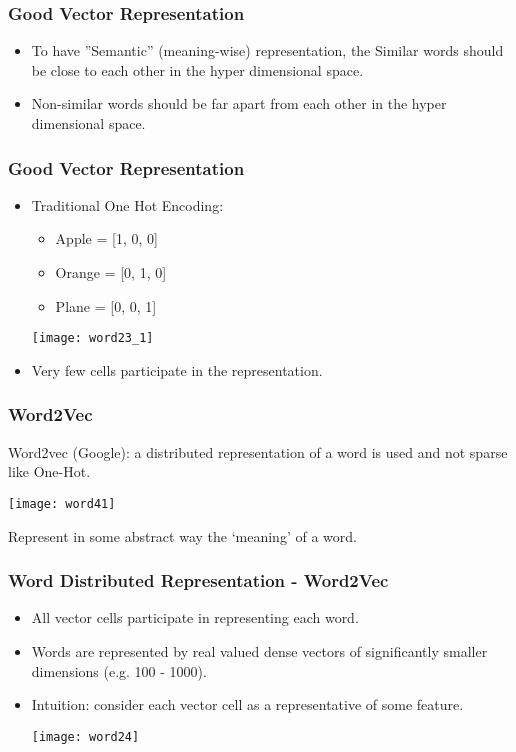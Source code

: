 \begin{frame}[fragile]\frametitle{Good Vector Representation}
\begin{itemize}
\item To have ''Semantic'' (meaning-wise) representation, the Similar words should be close to each other in the hyper dimensional space.
\item Non-similar words should be far apart from each other in the hyper dimensional space.
\end{itemize}
\end{frame}

\begin{frame}[fragile]\frametitle{Good Vector Representation}
\begin{itemize}
\item Traditional One Hot Encoding:
	\begin{itemize}
	\item Apple = [1, 0, 0]
	\item Orange = [0, 1, 0]
	\item Plane = [0, 0, 1]
	\end{itemize}
\begin{center}
\texttt{[image: word23\_1]}
\end{center}
\item Very few cells participate in the representation.
\end{itemize}
\end{frame}



\begin{frame}[fragile]\frametitle{Word2Vec}
Word2vec  (Google): a distributed representation of a word is used and not sparse like One-Hot.
\begin{center}
\texttt{[image: word41]}
\end{center}
Represent in some abstract way the `meaning' of a word.

\end{frame}

\begin{frame}[fragile]\frametitle{Word Distributed Representation - Word2Vec}
\begin{itemize}
\item All vector cells participate in representing each word.
\item Words are represented by real valued dense vectors of significantly smaller dimensions (e.g. 100 - 1000).
\item  Intuition: consider each vector cell as a representative of some feature.
\begin{center}
\texttt{[image: word24]}
\end{center}
\end{itemize}
\end{frame}




